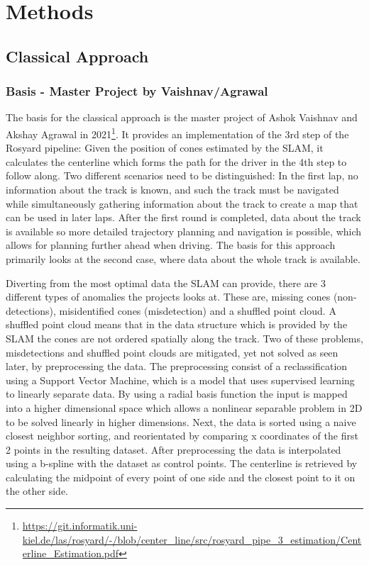 \graphicspath{{Chapter/Figs/methods/}}
\chapter{Methods}


\section{Classical Approach}

\subsection{Basis - Master Project by Vaishnav/Agrawal}
The basis for the classical approach is the master project of Ashok Vaishnav and Akshay Agrawal in 2021\footnote{\url{https://git.informatik.uni-kiel.de/las/rosyard/-/blob/center_line/src/rosyard_pipe_3_estimation/Centerline_Estimation.pdf}}.
It provides an implementation of the 3rd step of the Rosyard pipeline: Given the position of cones estimated by the SLAM, it calculates the centerline which forms the path for the driver in the 4th step to follow along.
Two different scenarios need to be distinguished: In the first lap, no information about the track is known, and such the track must be navigated while simultaneously gathering information about the track to create a map that can be used in later laps. After the first round is completed, data about the track is available so more detailed trajectory planning and navigation is possible, which allows for planning further ahead when driving. The basis for this approach primarily looks at the second case, where data about the whole track is available.

Diverting from the most optimal data the SLAM can provide, there are 3 different types of anomalies the projects looks at. These are, missing cones (non-detections), misidentified cones (misdetection) and a shuffled point cloud. A shuffled point cloud means that in the data structure which is provided by the SLAM the cones are not ordered spatially along the track. Two of these problems, misdetections and shuffled point clouds are mitigated, yet not solved as seen later, by preprocessing the data. The preprocessing consist of a reclassification using a Support Vector Machine\cite{cortes1995}, which is a model that uses supervised learning to linearly separate data. By using a radial basis function the input is mapped into a higher dimensional space which allows a nonlinear separable problem in 2D to be solved linearly in higher dimensions. Next, the data is sorted using a naive closest neighbor sorting, and reorientated by comparing x coordinates of the first 2 points in the resulting dataset. After preprocessing the data is interpolated using a b-spline with the dataset as control points. The centerline is retrieved by calculating the midpoint of every point of one side and the closest point to it on the other side.


